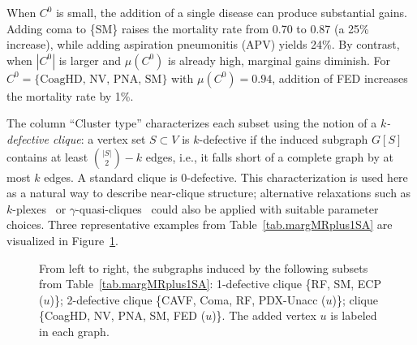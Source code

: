 When $C^0$ is small, the addition of a single disease can produce
substantial gains. Adding coma to \{SM\} raises the mortality rate
from 0.70 to 0.87 (a 25\% increase), while adding aspiration
pneumonitis (APV) yields 24\%. By contrast, when $|C^0|$ is larger
and $\mu(C^0)$ is already high, marginal gains diminish. For
$C^0 = \{\text{CoagHD, NV, PNA, SM}\}$ with $\mu(C^0) = 0.94$,
addition of FED increases the mortality rate by 1\%.

The column ``Cluster type'' characterizes each subset using the notion
of a \textit{$k$-defective clique}: a vertex set $S \subset V$ is $k$-defective
if the induced subgraph $G[S]$ contains at least $\binom{|S|}{2} - k$
edges, i.e., it falls short of a complete graph by at most $k$ edges.
A standard clique is 0-defective. This characterization is used here
as a natural way to describe near-clique structure; alternative
relaxations such as $k$-plexes~\citep{BBSBIVH11kplex} or
$\gamma$-quasi-cliques~\citep{Pattillo2013qclique} could also be
applied with suitable parameter choices. Three representative examples from
Table~\ref{tab.margMRplus1SA} are visualized in Figure~\ref{fig.defclq123}.


\begin{figure}[htbp]
    \centering
    \caption{From left to right, the subgraphs induced by the
    following subsets from Table~\ref{tab.margMRplus1SA}: 1-defective
    clique \{RF, SM, ECP ($u$)\}; 2-defective clique \{CAVF, Coma,
    RF, PDX-Unacc ($u$)\}; clique \{CoagHD, NV, PNA, SM, FED
    ($u$)\}. The added vertex $u$ is labeled in each graph.}
    \label{fig.defclq123}
\end{figure}

